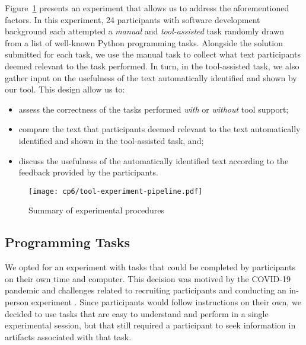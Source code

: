 Figure~\ref{fig:tool-experiment-procedures} presents an experiment that allows us to address the aforementioned factors. In this experiment, 24 participants with software development background each attempted a
\textit{manual} and \textit{tool-assisted} task randomly drawn from a list of well-known Python programming tasks.
Alongside the solution submitted for each task, we use the manual task to collect what text participants deemed relevant to the task performed.
In turn, in the tool-assisted task, we also gather input on the usefulness of the text automatically identified and shown by our tool. 
This design allow us to:




\begin{itemize}
    \item assess the correctness of the tasks performed \textit{with} or \textit{without} tool support;
    \item compare  the text that participants deemed relevant to the text automatically identified
    and shown in the tool-assisted task, and;
    \item discuss the usefulness of the automatically identified text according to the feedback provided by the participants.
\end{itemize}
 





\begin{figure}
\centering
\texttt{[image: cp6/tool-experiment-pipeline.pdf]}
\caption{Summary of experimental procedures}
\label{fig:tool-experiment-procedures}
\end{figure}





\subsection{Programming Tasks}
\label{cp6:tasks}


We opted for an experiment with tasks that could be completed by participants on their own time and computer.
This decision was motived by the COVID-19 pandemic and challenges related to recruiting participants and conducting an in-person experiment \red{~\cite{}}. 
Since participants would follow instructions on their own, we decided to use tasks that are easy to understand and perform in a single experimental session, but that still required a participant  
to seek information in artifacts associated with that task.



